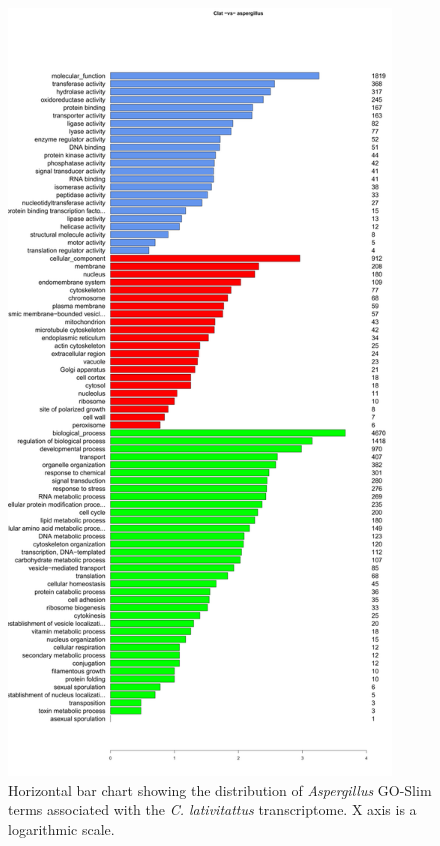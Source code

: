 \begin{figure}[tbp]
  \includegraphics[width=4in]{./Chapter_Coelomomyces/img/Clat_aspergillus_GOPlot.png}
  \caption[\textit{C. lat} transcriptome GO term distribution]{Horizontal bar chart showing the distribution of \textit{Aspergillus} GO-Slim terms associated with the \textit{C. lativitattus} transcriptome. X axis is a logarithmic scale.}
  \label{fig:ChClat_GOPlot}
\end{figure}

